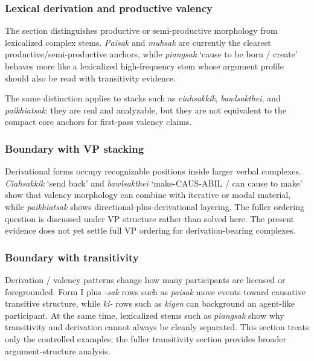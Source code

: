 \documentclass[
  11pt,
  a4paper,
]{article}
\newcommand{\tdim}[1]{\textit{#1}}
\newcommand{\glossquote}[1]{`#1'}
\begin{document}
\subsubsection{Lexical derivation and productive
valency}\label{lexical-derivation-and-productive-valency}

The section distinguishes productive or semi-productive morphology from
lexicalized complex stems. \tdim{Paisak} and \tdim{muhsak} are currently
the clearest productive/semi-productive anchors, while \tdim{piangsak}
\glossquote{cause to be born / create} behaves more like a lexicalized
high-frequency stem whose argument profile should also be read with
transitivity evidence.

The same distinction applies to stacks such as \tdim{ciahsakkik},
\tdim{bawlsakthei}, and \tdim{paikhiatsak}: they are real and
analyzable, but they are not equivalent to the compact core anchors for
first-pass valency claims.

\subsubsection{Boundary with VP
stacking}\label{boundary-with-vp-stacking}

Derivational forms occupy recognizable positions inside larger verbal
complexes. \tdim{Ciahsakkik} \glossquote{send back} and
\tdim{bawlsakthei} \glossquote{make-CAUS-ABIL / can cause to make} show
that valency morphology can combine with iterative or modal material,
while \tdim{paikhiatsak} shows directional-plus-derivational layering.
The fuller ordering question is discussed under VP structure rather than
solved here. The present evidence does not yet settle full VP ordering
for derivation-bearing complexes.

\subsubsection{Boundary with
transitivity}\label{boundary-with-transitivity}

Derivation / valency patterns change how many participants are licensed
or foregrounded. Form I plus \tdim{-sak} rows such as \tdim{paisak} move
events toward causative transitive structure, while \tdim{ki-} rows such
as \tdim{kigen} can background an agent-like participant. At the same
time, lexicalized stems such as \tdim{piangsak} show why transitivity
and derivation cannot always be cleanly separated. This section treats
only the controlled examples; the fuller transitivity section provides
broader argument-structure analysis.
\end{document}

